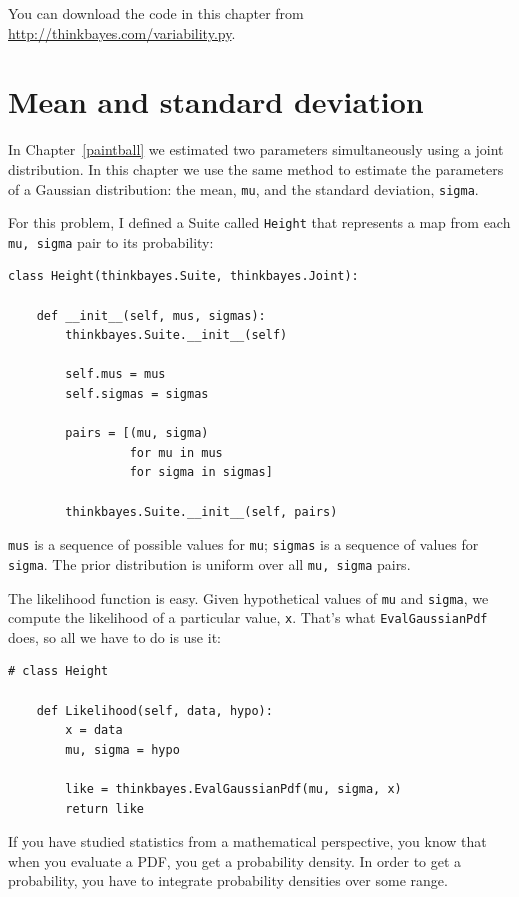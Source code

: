 \documentclass[12pt]{book}
\begin{document}
You can download the code in this chapter from
\url{http://thinkbayes.com/variability.py}.


\section{Mean and standard deviation}

In Chapter~\ref{paintball} we estimated two parameters simultaneously
using a joint distribution.  In this chapter we use the same
method to estimate the parameters of a Gaussian distribution:
the mean, {\tt mu}, and the standard deviation, {\tt sigma}.

For this problem, I defined a Suite called {\tt Height} that
represents a map from each {\tt mu, sigma} pair to its probability:

\begin{verbatim}
class Height(thinkbayes.Suite, thinkbayes.Joint):

    def __init__(self, mus, sigmas):
        thinkbayes.Suite.__init__(self)

        self.mus = mus
        self.sigmas = sigmas

        pairs = [(mu, sigma) 
                 for mu in mus
                 for sigma in sigmas]

        thinkbayes.Suite.__init__(self, pairs)
\end{verbatim}

{\tt mus} is a sequence of possible values for {\tt mu}; {\tt sigmas}
is a sequence of values for {\tt sigma}.  The prior distribution
is uniform over all {\tt mu, sigma} pairs.

The likelihood function is easy.  Given hypothetical values
of {\tt mu} and {\tt sigma}, we compute the likelihood
of a particular value, {\tt x}.  That's what {\tt EvalGaussianPdf}
does, so all we have to do is use it:

\begin{verbatim}
# class Height

    def Likelihood(self, data, hypo):
        x = data
        mu, sigma = hypo

        like = thinkbayes.EvalGaussianPdf(mu, sigma, x)
        return like
\end{verbatim}

If you have studied statistics from a mathematical perspective,
you know that when you evaluate a PDF, you get a probability
density.  In order to get a probability, you have to integrate
probability densities over some range.
\end{document}
